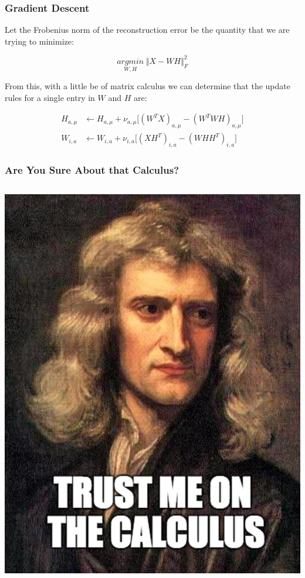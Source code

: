 \documentclass{beamer}
\begin{document}
\begin{frame}
  \frametitle{Gradient Descent}
  Let the Frobenius norm of the reconstruction error be the quantity that we are trying to minimize:

  $$ \underset{W, H}{argmin} \; \big\Vert X - W H \big\Vert^2_{F} $$ \vspace{0.5mm}

  From this, with a little be of matrix calculus we can determine that the update rules for a single entry in $W$ and $H$ are: \vspace{-1mm}

  \begin{align*}
    H_{a, \mu} &\leftarrow H_{a, \mu} + \nu_{a, \mu}\big[(W^T X)_{a, \mu} - (W^T WH)_{a, \mu}\big] \\
    W_{i, a} &\leftarrow W_{i, a} + \nu_{i, a}\big[(XH^T)_{i, a} - (WHH^T)_{i, a}\big]
  \end{align*}
\end{frame}

\begin{frame}
  \frametitle{Are You Sure About that Calculus?}
  \begin{columns}
    \includegraphics[width=\textwidth]{images/newton_meme.png}
  \end{columns}
\end{frame}
\end{document}
